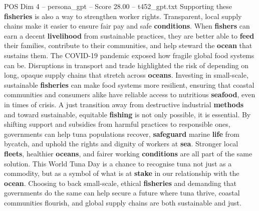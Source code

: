 \begin{textsample}{POS Dim 4 – persona\_gpt – Score 28.00 – t452\_gpt.txt}
Supporting these \textbf{fisheries} is also a way to strengthen worker rights.
Transparent, local supply chains make it easier to ensure fair pay and safe \textbf{conditions}.
When \textbf{fishers} can earn a decent \textbf{livelihood} from sustainable practices, they are better able to \textbf{feed} their families, contribute to their communities, and help steward the \textbf{ocean} that sustains them.
The COVID-19 pandemic exposed how fragile global food systems can be.
Disruptions in transport and trade highlighted the risk of depending on long, opaque supply chains that stretch across \textbf{oceans}.
Investing in small-scale, sustainable \textbf{fisheries} can make food systems more resilient, ensuring that coastal communities and consumers alike have reliable access to nutritious \textbf{seafood}, even in times of crisis.
A just transition away from destructive industrial \textbf{methods} and toward sustainable, equitable \textbf{fishing} is not only possible, it is essential.
By shifting support and subsidies from harmful practices to responsible ones, governments can help tuna populations recover, \textbf{safeguard} marine \textbf{life} from bycatch, and uphold the rights and dignity of workers at \textbf{sea}.
Stronger local \textbf{fleets}, healthier \textbf{oceans}, and fairer working \textbf{conditions} are all part of the same solution.
This World Tuna Day is a chance to recognise tuna not just as a commodity, but as a symbol of what is at \textbf{stake} in our relationship with the \textbf{ocean}.
Choosing to back small-scale, ethical \textbf{fisheries} and demanding that governments do the same can help secure a future where tuna thrive, coastal communities flourish, and global supply chains are both sustainable and just.

\end{textsample}
